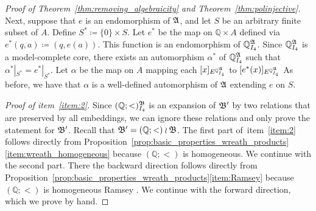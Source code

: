 \begin{proof}[Proof of Theorem~\ref{thm:removing_algebraicity} and Theorem~\ref{thm:polinjective}]
Next, suppose that $e$ is an endomorphism of $\mathfrak{A}$, and let $S$ be an arbitrary finite subset of $A$.
%
Define $S^{\ast}\coloneqq\{0\}\times S$. 
%
Let $e^{\ast}$ be the map on $\mathbb{Q}\times A$ defined via $e^{\ast}(q,a)\coloneqq(q,e(a))$.
%
This function is an endomorphism of $\mathbb{Q}^{\mathfrak{A}}_{I_4}$.   
%
Since $\mathbb{Q}^{\mathfrak{A}}_{I_4}$ is a model-complete core, there exists an automorphism ${\alpha}^{\ast}$ of 
$\mathbb{Q}^{\mathfrak{A}}_{I_4}$ such that ${\alpha}^{\ast}|_{S^{\ast}}=e^{\ast}|_{S^{\ast}}$.
%
Let $\alpha$ be the map on $A$ mapping each $[x]_{E^{\smash{\mathbb{Q}^{\mathfrak{A}}_{I_4}}}}$ to $[e^{\ast}(x)]_{E^{\smash{\mathbb{Q}^{\mathfrak{A}}_{I_4}}}}$
%
As before, we have that  $\alpha$ is a well-defined automorphism of $\mathfrak{A}$ extending $e$ on $S$.

\textit{Proof of item~\ref{item:2}.} Since $(\mathbb{Q};<)^{\mathfrak{B}}_{I_4}$ is an expansion of $\mathfrak{B}'$ by two relations that are preserved by all embeddings, we can ignore these relations and only prove the statement for $\mathfrak{B}'$.
%
Recall that $\mathfrak{B}'=(\mathbb{Q};<)\wr\mathfrak{B}$.
%
The first part of~item~\ref{item:2} follows directly from Proposition~\ref{prop:basic_properties_wreath_products}\eqref{item:wreath_homogeneous} because $(\mathbb{Q};<)$ is homogeneous.
%
We continue with the second part. 
% 
There the backward direction follows directly from Proposition~\ref{prop:basic_properties_wreath_products}\eqref{item:Ramsey} because $(\mathbb{Q};<)$ is homogeneous Ramsey \cite{kechris2005fraisse}.
%
We continue with the forward direction, which we prove by hand.


\end{proof}
